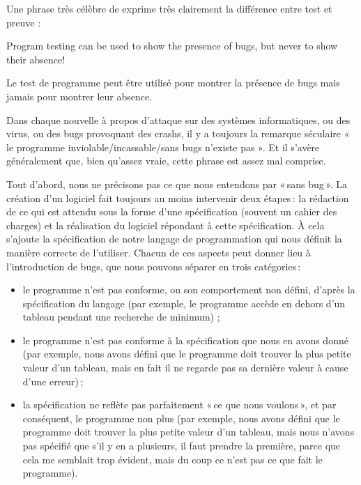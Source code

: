 Une phrase très célèbre de  exprime très clairement la différence entre
test et preuve :



\begin{Quotation}[Dijkstra]
Program testing can be used to show the presence of bugs, but never to show
their absence!
\end{Quotation}



Le test de programme peut être utilisé pour montrer la présence de bugs mais
jamais pour montrer leur absence.





Dans chaque nouvelle à propos d'attaque sur des systèmes informatiques, ou
des virus, ou des bugs provoquant des crashs, il y a toujours la remarque
séculaire « le programme inviolable/incassable/sans bugs n'existe pas ». Et
il s'avère généralement que, bien qu'assez vraie, cette phrase est assez
mal comprise.



Tout d’abord, nous ne précisons pas ce que nous entendons par « sans bug ».
La création d’un logiciel fait toujours au moins intervenir deux étapes : la
rédaction de ce qui est attendu sous la forme d’une spécification (souvent
un cahier des charges) et la réalisation du logiciel répondant à cette
spécification. À cela s’ajoute la spécification de notre langage de
programmation qui nous définit la manière correcte de l’utiliser. Chacun de
ces aspects peut donner lieu à l’introduction de bugs, que nous pouvons
séparer en trois catégories :


\begin{itemize}
\item le programme n’est pas conforme, ou son comportement non défini,
      d’après la spécification du langage (par exemple, le programme accède
      en dehors d’un tableau pendant une recherche de minimum) ;
\item le programme n’est pas conforme à la spécification que nous en avons
      donné (par exemple, nous avons défini que le programme doit trouver
      la plus petite valeur d’un tableau, mais en fait il ne regarde pas sa
      dernière valeur à cause d’une erreur) ;
\item la spécification ne reflète pas parfaitement « ce que nous voulons »,
      et par conséquent, le programme non plus (par exemple, nous avons
      défini que le programme doit trouver la plus petite valeur d’un
      tableau, mais nous n’avons pas spécifié que s’il y en a plusieurs, il
      faut prendre la première, parce que cela me semblait trop évident,
      mais du coup ce n’est pas ce que fait le programme).
\end{itemize}


